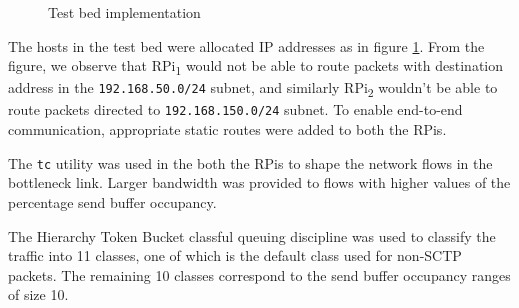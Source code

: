 \begin{figure}[h]
  \caption{Test bed implementation}
  \label{fig:testbed}
\end{figure}

The hosts in the test bed were allocated IP addresses as in figure
\ref{fig:testbed}.
From the figure, we observe that RPi\textsubscript{1}
would not be able to route packets with destination address in the
\texttt{192.168.50.0/24} subnet, and similarly RPi\textsubscript{2}
wouldn't be able to route packets directed to
\texttt{192.168.150.0/24} subnet. To enable end-to-end communication,
appropriate static routes were added to both the RPis.

The \texttt{tc} utility was used in the both the RPis to shape the
network flows in the bottleneck link. Larger bandwidth was
provided to flows with higher values of the percentage send buffer occupancy.

The Hierarchy Token Bucket classful queuing discipline was used to classify the
traffic into 11 classes, one of which is the default class used for non-SCTP
packets. The remaining 10 classes correspond to the send buffer occupancy
ranges of size 10.

